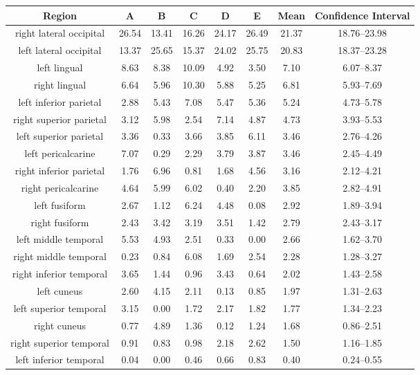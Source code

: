 
\begin{tabular}{cccccccc}
\toprule
Region & A & B & C & D & E  & Mean & Confidence Interval\\
\midrule
right lateral occipital & 26.54 & 13.41 & 16.26 & 24.17 & 26.49 & 21.37 & 18.76--23.98 \\
left lateral occipital & 13.37 & 25.65 & 15.37 & 24.02 & 25.75 & 20.83 & 18.37--23.28 \\
left lingual & 8.63 & 8.38 & 10.09 & 4.92 & 3.50 & 7.10 & 6.07--8.37 \\
right lingual & 6.64 & 5.96 & 10.30 & 5.88 & 5.25 & 6.81 & 5.93--7.69 \\
left inferior parietal & 2.88 & 5.43 & 7.08 & 5.47 & 5.36 & 5.24 & 4.73--5.78 \\
right superior parietal & 3.12 & 5.98 & 2.54 & 7.14 & 4.87 & 4.73 & 3.93--5.53 \\
left superior parietal & 3.36 & 0.33 & 3.66 & 3.85 & 6.11 & 3.46 & 2.76--4.26 \\
left pericalcarine & 7.07 & 0.29 & 2.29 & 3.79 & 3.87 & 3.46 & 2.45--4.49 \\
right inferior parietal & 1.76 & 6.96 & 0.81 & 1.68 & 4.56 & 3.16 & 2.12--4.21 \\
right pericalcarine & 4.64 & 5.99 & 6.02 & 0.40 & 2.20 & 3.85 & 2.82--4.91 \\
left fusiform & 2.67 & 1.12 & 6.24 & 4.48 & 0.08 & 2.92 & 1.89--3.94 \\
right fusiform & 2.43 & 3.42 & 3.19 & 3.51 & 1.42 & 2.79 & 2.43--3.17 \\
left middle temporal & 5.53 & 4.93 & 2.51 & 0.33 & 0.00 & 2.66 & 1.62--3.70 \\
right middle temporal & 0.23 & 0.84 & 6.08 & 1.69 & 2.54 & 2.28 & 1.28--3.27 \\
right inferior temporal & 3.65 & 1.44 & 0.96 & 3.43 & 0.64 & 2.02 & 1.43--2.58 \\
left cuneus & 2.60 & 4.15 & 2.11 & 0.13 & 0.85 & 1.97 & 1.31--2.63 \\
left superior temporal & 3.15 & 0.00 & 1.72 & 2.17 & 1.82 & 1.77 & 1.34--2.23 \\
right cuneus & 0.77 & 4.89 & 1.36 & 0.12 & 1.24 & 1.68 & 0.86--2.51 \\
right superior temporal & 0.91 & 0.83 & 0.98 & 2.18 & 2.62 & 1.50 & 1.16--1.85 \\
left inferior temporal & 0.04 & 0.00 & 0.46 & 0.66 & 0.83 & 0.40 & 0.24--0.55 \\
\bottomrule
\end{tabular}
